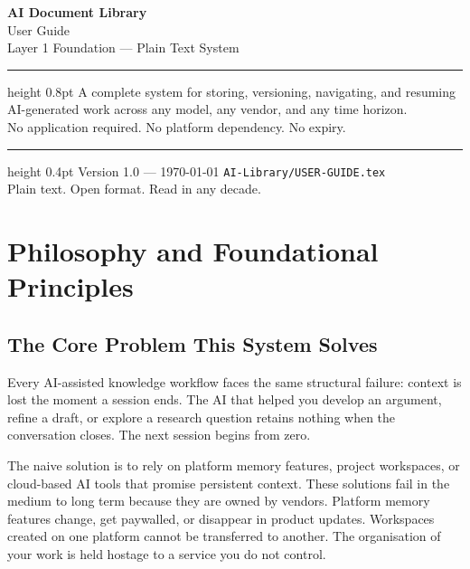 \documentclass[12pt,letterpaper]{article}
\begin{document}
\begin{titlepage}
\centering
\vspace*{1.5in}
{\Huge\bfseries AI Document Library}\\[12pt]
{\Large User Guide}\\[6pt]
{\large Layer 1 Foundation --- Plain Text System}\\[24pt]
\hrule height 0.8pt
\vspace{16pt}
{\normalsize
A complete system for storing, versioning, navigating, and resuming\\
AI-generated work across any model, any vendor, and any time horizon.\\
No application required. No platform dependency. No expiry.
}
\vspace{16pt}
\hrule height 0.4pt
\vspace{32pt}
{\small Version 1.0 \quad --- \quad \today}
\vfill
{\footnotesize
\texttt{AI-Library/USER-GUIDE.tex}\\
Plain text. Open format. Read in any decade.
}
\end{titlepage}

\newpage
\tableofcontents
\newpage

\section{Philosophy and Foundational Principles}

\subsection{The Core Problem This System Solves}

Every AI-assisted knowledge workflow faces the same structural failure: context
is lost the moment a session ends. The AI that helped you develop an argument,
refine a draft, or explore a research question retains nothing when the
conversation closes. The next session begins from zero.

The naive solution is to rely on platform memory features, project workspaces,
or cloud-based AI tools that promise persistent context. These solutions fail in
the medium to long term because they are owned by vendors. Platform memory
features change, get paywalled, or disappear in product updates. Workspaces
created on one platform cannot be transferred to another. The organisation of
your work is held hostage to a service you do not control.
\end{document}

